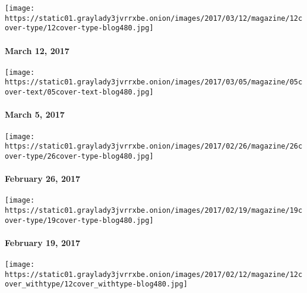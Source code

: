 \href{https://www.nytimes3xbfgragh.onion/interactive/2017/03/09/magazine/25-songs-that-tell-us-where-music-is-going.html}{}

\texttt{[image: https://static01.graylady3jvrrxbe.onion/images/2017/03/12/magazine/12cover-type/12cover-type-blog480.jpg]}

\hypertarget{march-12-2017}{%
\paragraph{March 12, 2017}\label{march-12-2017}}

\href{https://www.nytimes3xbfgragh.onion/issue/magazine/2017/03/03/magazine-index-20170305}{}

\texttt{[image: https://static01.graylady3jvrrxbe.onion/images/2017/03/05/magazine/05cover-text/05cover-text-blog480.jpg]}

\hypertarget{march-5-2017}{%
\paragraph{March 5, 2017}\label{march-5-2017}}

\href{https://www.nytimes3xbfgragh.onion/issue/magazine/2017/02/24/magazine-index-20170226}{}

\texttt{[image: https://static01.graylady3jvrrxbe.onion/images/2017/02/26/magazine/26cover-type/26cover-type-blog480.jpg]}

\hypertarget{february-26-2017}{%
\paragraph{February 26, 2017}\label{february-26-2017}}

\href{http://www.nytimes3xbfgragh.onion/issue/magazine/2017/02/17/the-21917-issue-20170219}{}

\texttt{[image: https://static01.graylady3jvrrxbe.onion/images/2017/02/19/magazine/19cover-type/19cover-type-blog480.jpg]}

\hypertarget{february-19-2017}{%
\paragraph{February 19, 2017}\label{february-19-2017}}

\href{https://www.nytimes3xbfgragh.onion/issue/magazine/2017/02/10/magazine-index-20170212}{}

\texttt{[image: https://static01.graylady3jvrrxbe.onion/images/2017/02/12/magazine/12cover\_withtype/12cover\_withtype-blog480.jpg]}

